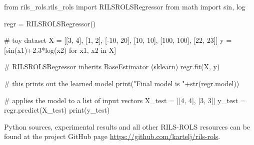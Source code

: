 \documentclass{bmcart}
\begin{document}
\begin{python}
	from rils_rols.rils_rols import RILSROLSRegressor
	from math import sin, log
	
	regr = RILSROLSRegressor()
	
	# toy dataset 
	X = [[3, 4], [1, 2], [-10, 20], [10, 10], [100, 100], [22, 23]]
	y = [sin(x1)+2.3*log(x2) for x1, x2 in X]
	
	# RILSROLSRegressor inherits BaseEstimator (sklearn)
	regr.fit(X, y)
	
	# this prints out the learned model
	print("Final model is "+str(regr.model))
	
	# applies the model to a list of input vectors
	X_test = [[4, 4], [3, 3]]
	y_test = regr.predict(X_test)
	print(y_test) 
\end{python}

Python sources, experimental results and all other \textsc{RILS-ROLS} resources can be found at the project GitHub page \url{https://github.com/kartelj/rils-rols}. 
 

\end{document}
